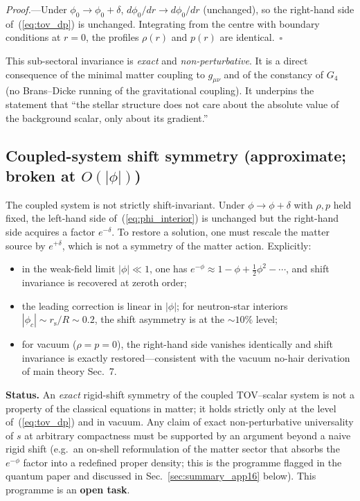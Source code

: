 \documentclass[11pt]{article}
\newcommand{\rs}{r_{\mathrm{s}}}
\begin{document}
\textit{Proof.}---Under $\phi_0 \to \phi_0 + \delta$,
$d\phi_0/dr \to d\phi_0/dr$ (unchanged), so the
right-hand side of~(\ref{eq:tov_dp}) is unchanged.
Integrating from the centre with boundary conditions
at $r=0$, the profiles $\rho(r)$ and $p(r)$ are
identical.~\hfill$\square$

This sub-sectoral invariance is \emph{exact} and
\emph{non-perturbative}.  It is a direct consequence
of the minimal matter coupling to $g_{\mu\nu}$ and of
the constancy of $G_4$ (no Brans--Dicke running of the
gravitational coupling).  It underpins the statement
that ``the stellar structure does not care about the
absolute value of the background scalar, only about
its gradient.''

\subsection{Coupled-system shift symmetry (approximate;
broken at $O(|\phi|)$)}
\label{sec:shift_coupled}

The coupled system is not strictly shift-invariant.
Under $\phi \to \phi + \delta$ with $\rho, p$ held
fixed, the left-hand side of~(\ref{eq:phi_interior})
is unchanged but the right-hand side acquires a factor
$e^{-\delta}$.  To restore a solution, one must rescale
the matter source by $e^{+\delta}$, which is not a
symmetry of the matter action.  Explicitly:
\begin{itemize}
\item in the weak-field limit $|\phi|\ll 1$, one has
  $e^{-\phi} \approx 1 - \phi + \tfrac12\phi^2 - \cdots$,
  and shift invariance is recovered at zeroth order;
\item the leading correction is linear in $|\phi|$;
  for neutron-star interiors $|\phi_c| \sim \rs/R \sim
  0.2$, the shift asymmetry is at the $\sim\!10\%$ level;
\item for vacuum ($\rho = p = 0$), the right-hand side
  vanishes identically and shift invariance is exactly
  restored---consistent with the vacuum no-hair
  derivation of main theory Sec.~7.
\end{itemize}

\textbf{Status.}  An \emph{exact} rigid-shift symmetry
of the coupled TOV--scalar system is not a property of
the classical equations in matter; it holds strictly only
at the level of~(\ref{eq:tov_dp}) and in vacuum.  Any
claim of exact non-perturbative universality of $s$ at
arbitrary compactness must be supported by an argument
beyond a naive rigid shift (e.g.\ an on-shell
reformulation of the matter sector that absorbs the
$e^{-\phi}$ factor into a redefined proper density;
this is the programme flagged in the quantum paper and
discussed in Sec.~\ref{sec:summary_app16} below).
This programme is an \textbf{open task}.
\end{document}
